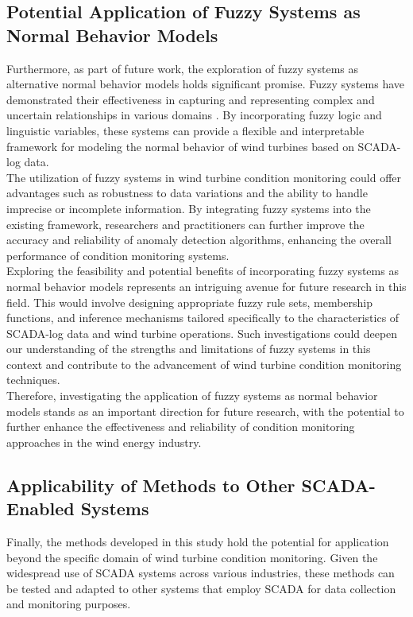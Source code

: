 \subsection{Potential Application of Fuzzy Systems as Normal Behavior Models}
\label{sub:fuzzy}

Furthermore, as part of future work, the exploration of fuzzy systems as alternative normal behavior models holds significant promise. 
Fuzzy systems have demonstrated their effectiveness in capturing and representing complex and uncertain relationships in various domains \cite{SCADA_NBM_Review}. 
By incorporating fuzzy logic and linguistic variables, these systems can provide a flexible and interpretable framework for modeling the normal behavior of wind turbines based on SCADA-log data. \\

The utilization of fuzzy systems in wind turbine condition monitoring could offer advantages such as robustness to data variations and the ability to handle imprecise or incomplete information. 
By integrating fuzzy systems into the existing framework, researchers and practitioners can further improve the accuracy and reliability of anomaly detection algorithms, enhancing the overall performance of condition monitoring systems. \\

Exploring the feasibility and potential benefits of incorporating fuzzy systems as normal behavior models represents an intriguing avenue for future research in this field. 
This would involve designing appropriate fuzzy rule sets, membership functions, and inference mechanisms tailored specifically to the characteristics of SCADA-log data and wind turbine operations. 
Such investigations could deepen our understanding of the strengths and limitations of fuzzy systems in this context and contribute to the advancement of wind turbine condition monitoring techniques. \\

Therefore, investigating the application of fuzzy systems as normal behavior models stands as an important direction for future research, with the potential to further enhance the effectiveness and reliability of condition monitoring approaches in the wind energy industry.

\subsection{Applicability of Methods to Other SCADA-Enabled Systems}

Finally, the methods developed in this study hold the potential for application beyond the specific domain of wind turbine condition monitoring. 
Given the widespread use of SCADA systems across various industries, these methods can be tested and adapted to other systems that employ SCADA for data collection and monitoring purposes.